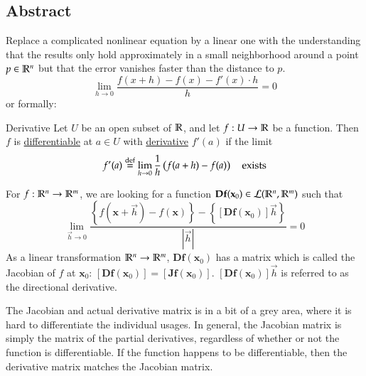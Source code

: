 \subsection{Abstract}
Replace a complicated nonlinear equation by a linear one with the understanding that the results only hold approximately in a small neighborhood around a point $p\in \mathbb{R}^n$ but that the error vanishes faster than the distance to $p$.
\begin{equation}
	\lim_{h\rightarrow 0} \frac{f(x+h)-f(x)-f'(x)\cdot h}{h}=0
\end{equation}
or formally: 
\begin{defn}{Derivative}
	Let $U$ be an open subset of $\mathbb{R}$, and let $f : U\to \mathbb{R}$ be a function. Then $f$ is \ul{differentiable} at $a\in U$ with \ul{derivative} $f'(a)$ if the limit
\begin{equation}
	f'(a)\overset{\text{def}}{=} \lim_{h\rightarrow 0}\frac{1}{h}\left(f(a+h)-f(a)\right)\quad \text{exists}
\end{equation}
\end{defn}
For $f : \mathbb{R}^n \rightarrow \mathbb{R}^m$, we are looking for a function $\textbf{Df}(\textbf{x}_0)\in \mathcal{L}(\mathbb{R}^n,\mathbb{R}^m)$ such that
\begin{equation}
	\lim_{\vec{h}\rightarrow 0} \frac{\left\{f(\bm{x}+\vec{h})-f(\bm{x})\right\}-\left\{[\bm{Df}(\bm{x}_0)]\vec{h}\right\}}{|\vec{h}|}=0
\end{equation}
As a linear transformation $\mathbb{R}^n\rightarrow \mathbb{R}^m$, $\bm{Df}(\bm{x}_0)$ has a matrix which is called the Jacobian of $f$ at $\bm{x}_0$: $[\bm{Df}(\bm{x}_0)]=[\bm{Jf}(\bm{x}_{0})]$. $[\bm{Df}(\bm{x}_0)]\vec{h}$ is referred to as the directional derivative. 

The Jacobian and actual derivative matrix is in a bit of a grey area, where it is hard to differentiate the individual usages. In general, the Jacobian matrix is simply the matrix of the partial derivatives, regardless of whether or not the function is differentiable. If the function happens to be differentiable, then the derivative matrix matches the Jacobian matrix. 
